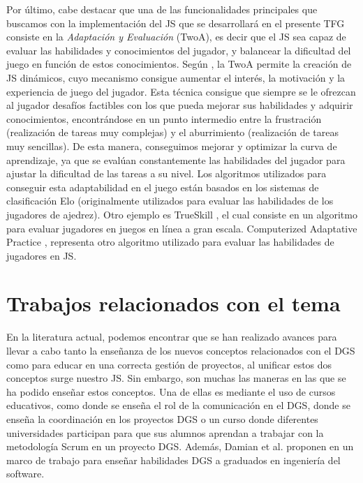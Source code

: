 Por último, cabe destacar que una de las funcionalidades principales que buscamos con la implementación del JS que se desarrollará en el presente TFG consiste en la \emph{Adaptación y Evaluación} (TwoA), es decir que el JS sea capaz de evaluar las habilidades y conocimientos del jugador, y balancear la dificultad del juego en función de estos conocimientos. Según \cite{westera2020artificial}, la TwoA permite la creación de JS dinámicos, cuyo mecanismo consigue aumentar el interés, la motivación y la experiencia de juego del jugador. Esta técnica consigue que siempre se le ofrezcan al jugador desafíos factibles con los que pueda mejorar sus habilidades y adquirir conocimientos, encontrándose en un punto intermedio entre la frustración (realización de tareas muy complejas) y el aburrimiento (realización de tareas muy sencillas). De esta manera, conseguimos mejorar y optimizar la curva de aprendizaje, ya que se evalúan constantemente las habilidades del jugador para ajustar la dificultad de las tareas a su nivel. Los algoritmos utilizados para conseguir esta adaptabilidad en el juego están basados en los sistemas de clasificación Elo \cite{elo1978rating} (originalmente utilizados para evaluar las habilidades de los jugadores de ajedrez). Otro ejemplo es TrueSkill \cite{herbrich2007trueskill}, el cual consiste en un algoritmo para evaluar jugadores en juegos en línea a gran escala. Computerized Adaptative Practice \cite{klinkenberg2011computer}, representa otro algoritmo utilizado para evaluar las habilidades de jugadores en JS.

\section{Trabajos relacionados con el tema}
\label{sec:TrabajosRelacionados}
En la literatura actual, podemos encontrar que se han realizado avances para llevar a cabo tanto la enseñanza de los nuevos conceptos relacionados con el DGS como para educar en una correcta gestión de proyectos, al unificar estos dos conceptos surge nuestro JS. Sin embargo, son muchas las maneras en las que se ha podido enseñar estos conceptos. Una de ellas es mediante el uso de cursos educativos, como \cite{kuhrmann2016distributed} donde se enseña el rol de la comunicación en el DGS, \cite{nordio2014experiment} donde se enseña la coordinación en los proyectos DGS o \cite{damian2012teaching} un curso donde diferentes universidades participan para que sus alumnos aprendan a trabajar con la metodología Scrum en un proyecto DGS. Además, Damian et al. proponen en \cite{damian2006instructional} un marco de trabajo para enseñar habilidades DGS a graduados en ingeniería del software.

